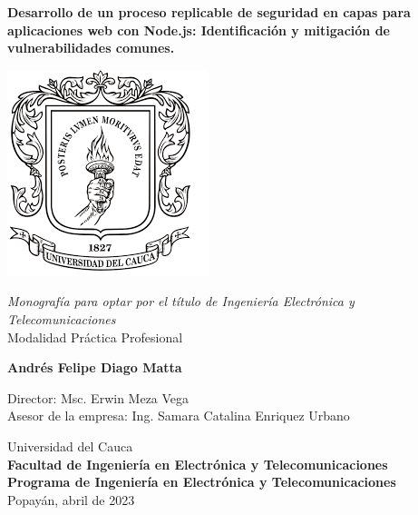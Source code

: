 \begin{center}
    {\textbf{Desarrollo de un proceso replicable de seguridad en capas para aplicaciones web con Node.js: Identificación y mitigación de vulnerabilidades comunes. }}\\
    \vfill

    \includegraphics[scale=0.7]{img/logo-unicauca.png} \\
    \vfill

    \textit{Monografía para optar por el título de Ingeniería Electrónica y Telecomunicaciones}\\
    Modalidad Práctica Profesional\\
    \vfill

    \textbf{Andrés Felipe Diago Matta}\\    
    \vfill

    Director: Msc. Erwin Meza Vega \\
    Asesor de la empresa: Ing. Samara Catalina Enriquez Urbano
    
    \vfill
    Universidad del Cauca\\
    \textbf{Facultad de Ingeniería en Electrónica y Telecomunicaciones}\\
    \textbf{Programa de Ingeniería en Electrónica y Telecomunicaciones}\\
    Popayán, abril de 2023\\
\end{center} 